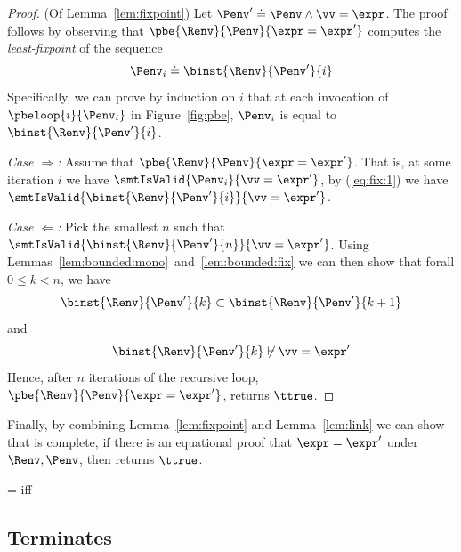 \begin{proof} (Of Lemma~\ref{lem:fixpoint})
%
Let $\Penv' \doteq \Penv \wedge \vv = \expr$.
%
The proof follows by observing that
$\pbe{\Renv}{\Penv}{\expr = \expr'}$
computes the \emph{least-fixpoint}
of the sequence
%
\begin{equation}
\Penv_i \doteq \binst{\Renv}{\Penv'}{i} \label{eq:fix:1}
\end{equation}
%
Specifically, we can prove by induction on $i$
that at each invocation of $\pbeloop{i}{\Penv_i}$
in Figure~\ref{fig:pbe}, $\Penv_i$ is equal to
$\binst{\Renv}{\Penv'}{i}$.

\emph{Case $\Rightarrow$:}
Assume that $\pbe{\Renv}{\Penv}{\expr = \expr'}$.
That is, at some iteration $i$ we have
$\smtIsValid{\Penv_i}{\vv = \expr'}$,
\ie by (\ref{eq:fix:1}) we have
$\smtIsValid{\binst{\Renv}{\Penv'}{i}}{\vv = \expr'}$.

\emph{Case $\Leftarrow$:}
Pick the smallest $n$ such that
$\smtIsValid{\binst{\Renv}{\Penv'}{n}}{\vv = \expr'}$.
Using Lemmas~\ref{lem:bounded:mono}~and~\ref{lem:bounded:fix}
we can then show that forall $0 \leq k < n$, we have
%
$$
\binst{\Renv}{\Penv'}{k} \subset \binst{\Renv}{\Penv'}{k+1}
$$
%
and
%
$$\binst{\Renv}{\Penv'}{k} \not \vdash {\vv = \expr'}$$
%
Hence, after $n$ iterations of the recursive loop,
$\pbe{\Renv}{\Penv}{\expr = \expr'}$, returns $\ttrue$.
\end{proof}

%
Finally, by combining Lemma~\ref{lem:fixpoint}
and  Lemma~\ref{lem:link}  we can show that
\pbesym is complete, \ie if there is an equational proof
that $\expr = \expr'$ under $\Renv, \Penv$,
then  returns $\ttrue$.

\begin{theorem} \label{thm:completeness}
   = \ttrue iff
\end{theorem}

\subsection{\pbesym Terminates} \label{sec:pbe:termination}

